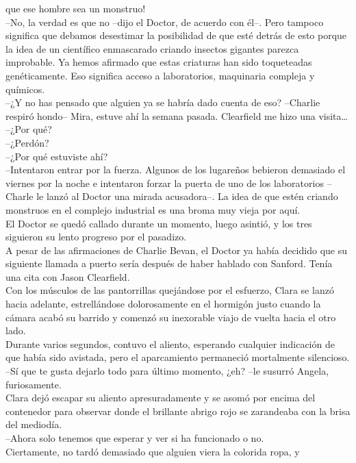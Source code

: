 que ese hombre sea un monstruo!\\
--No, la verdad es que no --dijo el Doctor, de acuerdo con él--. Pero
tampoco significa que debamos desestimar la posibilidad de que esté
detrás de esto porque la idea de un científico enmascarado criando
insectos gigantes parezca improbable. Ya hemos afirmado que estas
criaturas han sido toqueteadas genéticamente. Eso significa acceso a
laboratorios, maquinaria compleja y químicos.\\
--¿Y no has pensado que alguien ya se habría dado cuenta de eso?
--Charlie respiró hondo-- Mira, estuve ahí la semana pasada. Clearfield
me hizo una visita\ldots{}\\
--¿Por qué?\\
--¿Perdón?\\
--¿Por qué estuviste ahí?\\
--Intentaron entrar por la fuerza. Algunos de los lugareños bebieron
demasiado el viernes por la noche e intentaron forzar la puerta de uno
de los laboratorios --Charle le lanzó al Doctor una mirada acusadora--.
La idea de que estén criando monstruos en el complejo industrial es una
broma muy vieja por aquí.\\
El Doctor se quedó callado durante un momento, luego asintió, y los tres
siguieron su lento progreso por el pasadizo.\\
A pesar de las afirmaciones de Charlie Bevan, el Doctor ya había
decidido que su siguiente llamada a puerto sería después de haber
hablado con Sanford. Tenía una cita con Jason
Clearfield.\\[2\baselineskip]Con los músculos de las pantorrillas
quejándose por el esfuerzo, Clara se lanzó hacia adelante, estrellándose
dolorosamente en el hormigón justo cuando la cámara acabó su barrido y
comenzó su inexorable viajo de vuelta hacia el otro lado.\\
Durante varios segundos, contuvo el aliento, esperando cualquier
indicación de que había sido avistada, pero el aparcamiento permaneció
mortalmente silencioso.\\
--Sí que te gusta dejarlo todo para último momento, ¿eh? --le susurró
Angela, furiosamente.\\
Clara dejó escapar su aliento apresuradamente y se asomó por encima del
contenedor para observar donde el brillante abrigo rojo se zarandeaba
con la brisa del mediodía.\\
--Ahora solo tenemos que esperar y ver si ha funcionado o no.\\
Ciertamente, no tardó demasiado que alguien viera la colorida ropa, y
